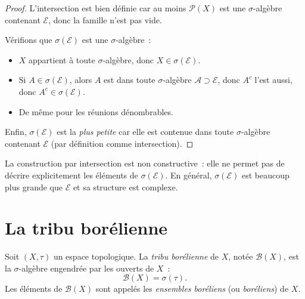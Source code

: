 \begin{proof}
L'intersection est bien d\'efinie car au moins $\mathcal{P}(X)$ est une
$\sigma$-alg\`ebre contenant $\mathcal{E}$, donc la famille n'est pas vide.

V\'erifions que $\sigma(\mathcal{E})$ est une $\sigma$-alg\`ebre~:
\begin{itemize}
    \item $X$ appartient \`a toute $\sigma$-alg\`ebre, donc $X \in \sigma(\mathcal{E})$.
    \item Si $A \in \sigma(\mathcal{E})$, alors $A$ est dans toute $\sigma$-alg\`ebre
    $\mathcal{A} \supset \mathcal{E}$, donc $A^c$ l'est aussi, donc
    $A^c \in \sigma(\mathcal{E})$.
    \item De m\^eme pour les r\'eunions d\'enombrables.
\end{itemize}
Enfin, $\sigma(\mathcal{E})$ est la \emph{plus petite} car elle est contenue dans
toute $\sigma$-alg\`ebre contenant $\mathcal{E}$ (par d\'efinition comme intersection).
\end{proof}

\begin{remarque}
La construction par intersection est non constructive~: elle ne permet pas de
d\'ecrire explicitement les \'el\'ements de $\sigma(\mathcal{E})$. En g\'en\'eral,
$\sigma(\mathcal{E})$ est beaucoup plus grande que $\mathcal{E}$ et sa structure
est complexe.
\end{remarque}

\section{La tribu bor\'elienne}

\begin{definition}
Soit $(X, \tau)$ un espace topologique. La \emph{tribu bor\'elienne} de $X$, not\'ee
$\mathcal{B}(X)$, est la $\sigma$-alg\`ebre engendr\'ee par les ouverts de $X$~:
\[
\mathcal{B}(X) = \sigma(\tau).
\]
Les \'el\'ements de $\mathcal{B}(X)$ sont appel\'es les \emph{ensembles bor\'eliens}
(ou \emph{bor\'eliens}) de $X$.
\end{definition}

